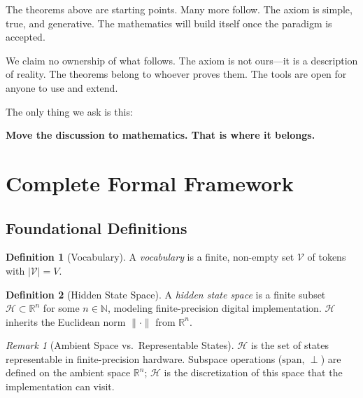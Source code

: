 \documentclass[11pt]{article}
\theoremstyle{definition}
\newtheorem{definition}{Definition}[section]
\theoremstyle{remark}
\newtheorem{remark}{Remark}[section]
\begin{document}
\medskip

The theorems above are starting points. Many more follow. The axiom is simple, true, and generative. The mathematics will build itself once the paradigm is accepted.

We claim no ownership of what follows. The axiom is not ours---it is a description of reality. The theorems belong to whoever proves them. The tools are open for anyone to use and extend.

\bigskip

The only thing we ask is this:

\begin{center}
\textbf{Move the discussion to mathematics. That is where it belongs.}
\end{center}

\newpage

\appendix
\section{Complete Formal Framework}

\subsection{Foundational Definitions}

\begin{definition}[Vocabulary]
A \emph{vocabulary} is a finite, non-empty set $\mathcal{V}$ of tokens with $|\mathcal{V}| = V$.
\end{definition}

\begin{definition}[Hidden State Space]
A \emph{hidden state space} is a finite subset $\mathcal{H} \subset \mathbb{R}^n$ for some $n \in \mathbb{N}$, modeling finite-precision digital implementation. $\mathcal{H}$ inherits the Euclidean norm $\|\cdot\|$ from $\mathbb{R}^n$.
\end{definition}

\begin{remark}[Ambient Space vs.\ Representable States]
$\mathcal{H}$ is the set of states representable in finite-precision hardware. Subspace operations ($\mathrm{span}$, $\perp$) are defined on the ambient space $\mathbb{R}^n$; $\mathcal{H}$ is the discretization of this space that the implementation can visit.
\end{remark}
\end{document}
